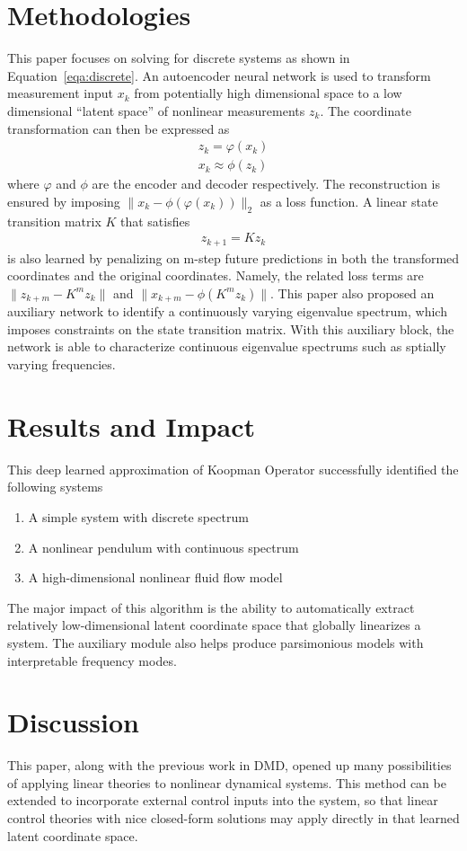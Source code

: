 \documentclass[12pt]{article}
\begin{document}
\section{Methodologies}

This paper focuses on solving for discrete systems as shown in Equation~\ref{eqa:discrete}.
An autoencoder neural network is used to transform measurement input $x_k$
from potentially high dimensional space to a low dimensional ``latent space'' of
nonlinear measurements $z_k$. The coordinate transformation can then be expressed as
\begin{gather}
  z_k = \varphi(x_k) \\
  x_k \approx \phi(z_k)
\end{gather}
where $\varphi$ and $\phi$ are the encoder and decoder respectively.
The reconstruction is ensured by imposing $\|x_k - \phi(\varphi(x_k))\|_2$ as a loss function.
A linear state transition matrix $K$ that satisfies
\begin{gather}
  z_{k+1} = K z_k
\end{gather}
is also learned by penalizing on m-step future
predictions in both the transformed coordinates and the original coordinates. Namely, the
related loss terms are $\|z_{k+m} - K^m z_{k}\|$ and $\|x_{k+m} - \phi(K^m z_{k})\|$.
This paper also proposed an auxiliary network to identify a continuously varying
eigenvalue spectrum, which imposes constraints on the state transition matrix.
With this auxiliary block, the network is able to characterize continuous eigenvalue spectrums
such as sptially varying frequencies.

\section{Results and Impact}

This deep learned approximation of Koopman Operator successfully identified the following systems
\begin{enumerate}
  \item A simple system with discrete spectrum
  \item A nonlinear pendulum with continuous spectrum
  \item A high-dimensional nonlinear fluid flow model
\end{enumerate}
The major impact of this algorithm is the ability to automatically extract
relatively low-dimensional latent coordinate space that globally linearizes a system.
The auxiliary module also helps produce parsimonious models with interpretable
frequency modes.

\section{Discussion}

This paper, along with the previous work in DMD, opened up many possibilities of applying
linear theories to nonlinear dynamical systems. This method can be extended to incorporate
external control inputs into the system, so that linear control theories with nice
closed-form solutions may apply directly in that learned latent coordinate space.

\newpage



\end{document}
